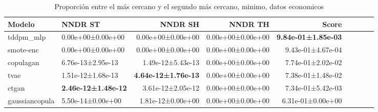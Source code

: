 \begin{table}[H]
\centering
\fontsize{10}{14}\selectfont
\caption{Proporción entre el más cercano y el segundo más cercano, minimo, datos economicos}
\label{table-nndr-economicos-b-min}
\begin{tabular}{|l|l|r|r|r|r|r|r|r|}
\hline
\rowcolor[gray]{0.8}
Modelo & NNDR ST & NNDR SH & NNDR TH & \textbf{Score} \\
\hline tddpm\_mlp & \cellcolor[rgb]{0.9, 0.54, 0.52} 0.00e+00±0.00e+00 & \cellcolor[rgb]{0.9, 0.54, 0.52} 0.00e+00±0.00e+00 & 0.00e+00±0.00e+00 & \bfseries 9.84e-01±1.85e-03 \\
\hline smote-enc & \cellcolor[rgb]{0.9, 0.54, 0.52} 0.00e+00±0.00e+00 & \cellcolor[rgb]{0.9, 0.54, 0.52} 0.00e+00±0.00e+00 & 0.00e+00±0.00e+00 & 9.43e-01±4.67e-04 \\
\hline copulagan & 6.76e-13±2.95e-13 & 1.49e-12±5.43e-13 & 0.00e+00±0.00e+00 & 7.74e-01±2.02e-02 \\
\hline tvae & 1.51e-12±1.68e-13 & \bfseries 4.64e-12±1.76e-13 & 0.00e+00±0.00e+00 & 7.38e-01±1.48e-02 \\
\hline ctgan & \bfseries 2.46e-12±1.48e-12 & 3.61e-12±2.05e-12 & 0.00e+00±0.00e+00 & 7.34e-01±5.42e-03 \\
\hline gaussiancopula & 5.50e-14±0.00e+00 & 1.81e-12±0.00e+00 & 0.00e+00±0.00e+00 & \cellcolor[rgb]{0.9, 0.54, 0.52} 6.31e-01±0.00e+00 \\
\hline
\end{tabular}
\end{table}
